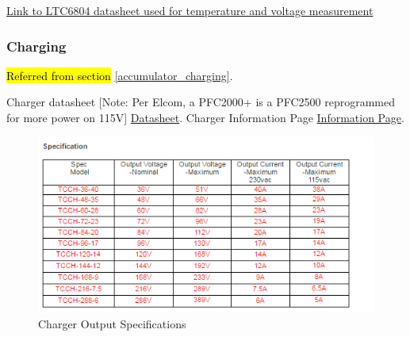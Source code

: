\documentclass{article}
\DeclareRobustCommand{\hlr}[1]{{\sethlcolor{pink}\hl{#1}}}
\begin{document}
\href{http://cds.linear.com/docs/en/datasheet/680412fc.pdf}{Link to LTC6804 datasheet used for temperature and voltage measurement}

\setcounter{subsubsection}{9}
\subsubsection{Charging}\label{appendix_accumulator_charger}
\hlr{Referred from section }\ref{accumulator_charging}.

Charger datasheet [Note: Per Elcom, a PFC2000+ is a PFC2500 reprogrammed for more power on 115V]
\href{http://www.elconchargers.com/f/PFC2500.pdfF}{Datasheet}. \newline
Charger Information Page
\href{http://www.elconchargers.com/f/PFC2500.pdfF}{Information Page}. \newline
\begin{figure}[H]
	\includegraphics[width=\linewidth]{charger_output}
	\caption{Charger Output Specifications}
\end{figure}
\end{document}
